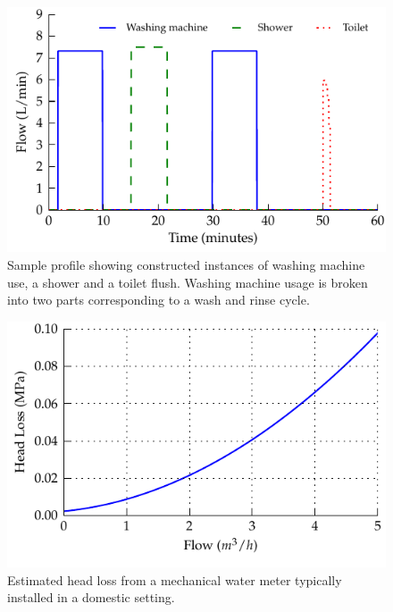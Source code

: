 \documentclass[10pt,final,journal]{IEEEtran}
\begin{document}
    \begin{figure}
        \begin{center}
        \includegraphics[width=\linewidth]{graph_profile}
        \end{center}
        \caption{Sample profile showing constructed instances of washing machine use, a shower and a toilet flush.
        Washing machine usage is broken into two parts corresponding to a wash and rinse cycle.}
        \label{fig:profileSample}
    \end{figure}

    \begin{figure}
        \begin{center}
        \includegraphics[width=\linewidth]{graph_pressureLoss}
        \end{center}
        \caption{Estimated head loss from a mechanical water meter typically installed in a domestic setting.}
        \label{fig:headloss}
    \end{figure}
\end{document}
